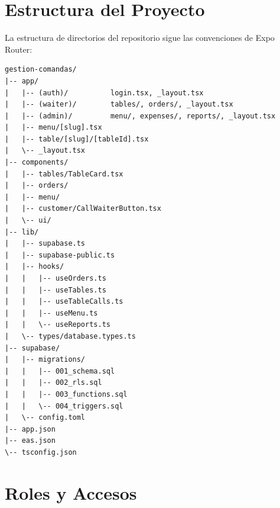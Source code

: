 \section{Estructura del Proyecto}

La estructura de directorios del repositorio sigue las convenciones de Expo Router:

\begin{Verbatim}[fontsize=\small, frame=single, framesep=3mm]
gestion-comandas/
|-- app/
|   |-- (auth)/          login.tsx, _layout.tsx
|   |-- (waiter)/        tables/, orders/, _layout.tsx
|   |-- (admin)/         menu/, expenses/, reports/, _layout.tsx
|   |-- menu/[slug].tsx
|   |-- table/[slug]/[tableId].tsx
|   \-- _layout.tsx
|-- components/
|   |-- tables/TableCard.tsx
|   |-- orders/
|   |-- menu/
|   |-- customer/CallWaiterButton.tsx
|   \-- ui/
|-- lib/
|   |-- supabase.ts
|   |-- supabase-public.ts
|   |-- hooks/
|   |   |-- useOrders.ts
|   |   |-- useTables.ts
|   |   |-- useTableCalls.ts
|   |   |-- useMenu.ts
|   |   \-- useReports.ts
|   \-- types/database.types.ts
|-- supabase/
|   |-- migrations/
|   |   |-- 001_schema.sql
|   |   |-- 002_rls.sql
|   |   |-- 003_functions.sql
|   |   \-- 004_triggers.sql
|   \-- config.toml
|-- app.json
|-- eas.json
\-- tsconfig.json
\end{Verbatim}

\section{Roles y Accesos}

